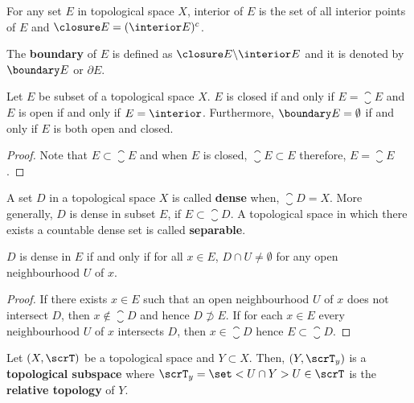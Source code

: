 \begin{proposition}
    For any set \(E\) in topological space \(X\), interior of  \(E\) is the set of all interior points of \(E\) and \(\closure E =( \interior E)^c\).
\end{proposition}

\begin{definition}
    The \textbf{boundary} of \(E\) is defined as \(\closure E \backslash \interior E\) and it is denoted by \(\boundary E\) or \(\partial E\).
\end{definition}

\begin{proposition}
    Let \(E\) be subset of a topological space \(X\). \(E\) is closed if and only if \(E = \closure E\) and \(E\) is open if and only if \(E = \interior\). Furthermore, \(\boundary E = \emptyset\) if and only if \(E\) is both open and closed.
\end{proposition}

\begin{proof}
    Note that \(E \subset \closure E\) and when \(E\) is closed, \(\closure E \subset E\) therefore, \(E = \closure E\). 
\end{proof}

\begin{definition}
    A set \(D\) in a topological space \(X\) is called \textbf{dense} when, \(\closure D = X\). More generally, \(D\) is dense in subset \(E\), if \(E \subset \closure D\). A topological space in which there exists a countable dense set is called \textbf{separable}.
\end{definition}

\begin{proposition}
    \(D\) is dense in \(E\) if and only if for all \(x \in E\), \(D \cap U \neq \emptyset\) for any open neighbourhood \(U\) of \(x\).
\end{proposition}

\begin{proof}
    If there exists \(x \in E\) such that an open neighbourhood \(U\) of \(x\) does not intersect \(D\), then \(x \notin \closure D\) and hence \(D \not\supset E\). If for each \(x \in E\) every neighbourhood \(U\) of \(x\) intersects \(D\), then \(x \in \closure D\) hence \(E \subset \closure D\).
\end{proof}

Let \((X,\scrT)\) be a topological space and \(Y \subset X\). Then, \((Y,\scrT_y)\) is a \textbf{topological subspace} where \(\scrT_y = \set<U \cap Y>{U \in \scrT}\) is the \textbf{relative topology} of \(Y\).


